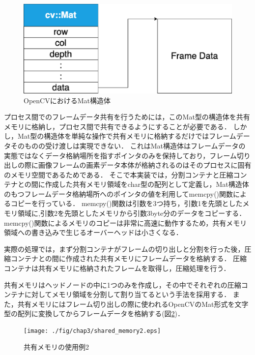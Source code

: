 \begin{figure}[H]
    \hspace*{\fill}
    \includegraphics[width=\linewidth]{./fig/chap3/mat.eps}
    \hspace*{\fill}
    \caption{OpenCVにおけるMat構造体}
    \label{mat}
\end{figure}

プロセス間でのフレームデータ共有を行うためには，このMat型の構造体を共有メモリに格納し，プロセス間で共有できるようにすることが必要である．
しかし，Mat型の構造体を単純な操作で共有メモリに格納するだけではフレームデータそのものの受け渡しは実現できない．
これはMat構造体はフレームデータの実態ではなくデータ格納場所を指すポインタのみを保持しており，フレーム切り出しの際に画像フレームの画素データ本体が格納されるのはそのプロセスに固有のメモリ空間であるためである．
そこで本実装では，分割コンテナと圧縮コンテナとの間に作成した共有メモリ領域をchar型の配列として定義し，Mat構造体のもつフレームデータ格納場所へのポインタの値を利用してmemcpy()関数によるコピーを行っている．
memcpy()関数は引数を3つ持ち，引数1を先頭としたメモリ領域に,引数2を先頭としたメモリから引数3byte分のデータをコピーする．
memcpy()関数によるメモリのコピーは非常に高速に動作するため，共有メモリ領域への書き込みで生じるオーバーヘッドは小さくなる．

実際の処理では，まず分割コンテナがフレームの切り出しと分割を行った後，圧縮コンテナとの間に作成された共有メモリにフレームデータを格納する．
圧縮コンテナは共有メモリに格納されたフレームを取得し，圧縮処理を行う．

共有メモリはヘッドノードの中に1つのみを作成し，その中でそれぞれの圧縮コンテナに対してメモリ領域を分割して割り当てるという手法を採用する．
また，共有メモリにはフレーム切り出しの際に使われるOpenCVのMat形式を文字型の配列に変換してからフレームデータを格納する(図\ref{shared_memory2})．

\begin{figure}[H]
    \hspace*{\fill}
    \texttt{[image: ./fig/chap3/shared\_memory2.eps]}
    \hspace*{\fill}
    \caption{共有メモリの使用例2}
    \label{shared_memory2}
\end{figure}


